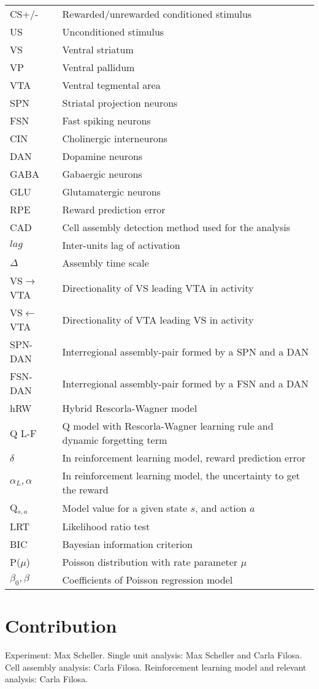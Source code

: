 \begin{tabular}{l l}
CS+/- &{Rewarded/unrewarded conditioned stimulus}\\
US &{Unconditioned stimulus}\\
VS &{Ventral striatum}\\
VP &{Ventral pallidum}\\
VTA &{Ventral tegmental area}\\
SPN &{Striatal projection neurons}\\
FSN &{Fast spiking neurons}\\
CIN &{Cholinergic interneurons}\\
DAN &{Dopamine neurons}\\
GABA &{Gabaergic neurons}\\
GLU &{Glutamatergic neurons}\\
RPE &{Reward prediction error}\\
CAD &{Cell assembly detection method used for the analysis}\\
$lag$ &{Inter-units lag of activation}\\
$\Delta$ &{Assembly time scale}\\
VS$\rightarrow$VTA &{Directionality of VS leading VTA in activity}\\
VS$\leftarrow$VTA &{Directionality of VTA leading VS in activity}\\
SPN-DAN &{Interregional assembly-pair formed by a SPN and a DAN}\\
FSN-DAN &{Interregional assembly-pair formed by a FSN and a DAN}\\
hRW &{Hybrid Rescorla-Wagner model}\\
Q L-F &{Q model with Rescorla-Wagner learning rule and dynamic forgetting term}\\
$\delta$ &{In reinforcement learning model, reward prediction error}\\
$\alpha_L,\alpha$ &{In reinforcement learning model, the uncertainty to get the reward}\\
Q$_{s,a}$ &{Model value for a given state $s$, and action $a$}\\
LRT &{Likelihood ratio test}\\
BIC &{Bayesian information criterion}\\
P($\mu$) &{Poisson distribution with rate parameter $\mu$}\\
$\beta_0,\beta$ &{Coefficients of Poisson regression model}\\
\end{tabular}
\pagebreak
\section*{Contribution}
Experiment: Max Scheller. Single unit analysis: Max Scheller and Carla Filosa. Cell assembly analysis: Carla Filosa. Reinforcement learning model and relevant analysis: Carla Filosa.